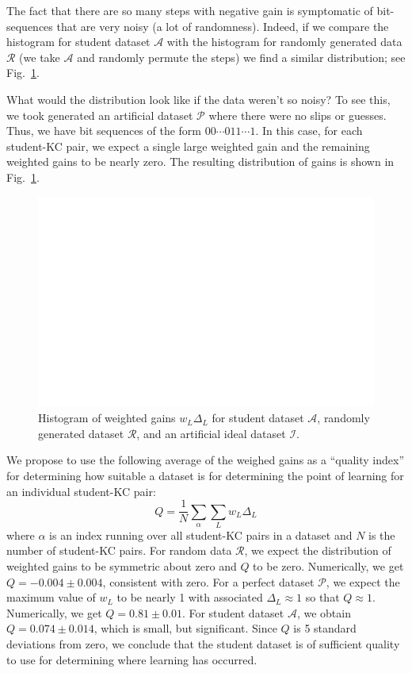 \documentclass[11pt,letterpaper]{article}
\begin{document}
The fact that there are so many steps with negative gain is
symptomatic of bit-sequences that are very noisy (a lot of
randomness).  Indeed, if we compare the histogram for student
dataset $\mathcal{A}$ with the histogram for 
randomly generated data $\mathcal{R}$ (we take $\mathcal{A}$ and
randomly permute the steps) we find a similar distribution;
see Fig.~\ref{weighted-gain-histogram2}.

What would the distribution look like if the data weren't 
so noisy?  To see this, we took generated an artificial dataset
$\mathcal{P}$ where there were no slips or guesses.  Thus,
we have bit sequences of the form $00\cdots011\cdots1$.
In this case, for each student-KC pair, we expect a single 
large weighted gain and the remaining weighted gains to
be nearly zero.  The resulting distribution of gains is shown
in  Fig.~\ref{weighted-gain-histogram2}.

\begin{figure}
  \centering \includegraphics{weighted-gain-histogram2.eps}
   \caption{Histogram of weighted gains $w_L \Delta_L$ for
     student dataset $\mathcal{A}$, randomly generated dataset $\mathcal{R}$,
     and an artificial ideal dataset $\mathcal{I}$.}
    \label{weighted-gain-histogram2}
\end{figure}


We propose to use the following average of the weighed gains as
a ``quality index'' for determining how suitable a 
dataset is for determining the point of learning for an individual
student-KC pair:
%
\begin{equation}
           Q= \frac{1}{N} \sum_\alpha \sum_L w_L \Delta_L
\end{equation}
%
where $\alpha$ is an index running over all student-KC pairs in a 
dataset and $N$ is the number of student-KC pairs.
For random data $\mathcal{R}$, we expect the distribution of weighted gains
to be symmetric about zero and $Q$ to be zero.  Numerically, we 
get  $Q=-0.004\pm0.004$, consistent with zero.
For a perfect dataset $\mathcal{P}$,
we expect the maximum value of $w_L$ to be nearly 1 
with associated $\Delta_L\approx 1$ so that $Q\approx 1$.
Numerically, we get $Q=0.81\pm0.01$.  For student dataset
$\mathcal{A}$, we obtain $Q=0.074\pm0.014$, which
is small, but significant.  Since $Q$ is 5 standard deviations from
zero, we conclude that the student dataset is of sufficient quality
to use for determining where learning has occurred.
\end{document}
